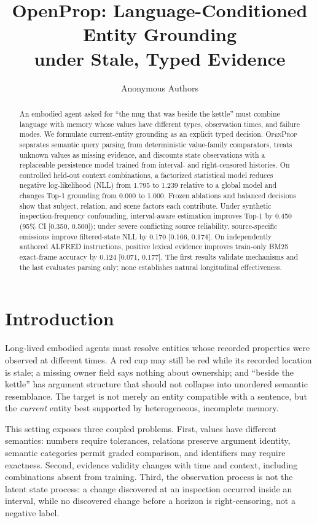 \documentclass{article}
\title{OpenProp: Language-Conditioned Entity Grounding\\under Stale, Typed Evidence}
\author{Anonymous Authors}
\newcommand{\method}{\textsc{OpenProp}}
\begin{document}
\maketitle

\begin{abstract}
An embodied agent asked for ``the mug that was beside the kettle'' must combine language with memory whose values have different types, observation times, and failure modes. We formulate current-entity grounding as an explicit typed decision. \method{} separates semantic query parsing from deterministic value-family comparators, treats unknown values as missing evidence, and discounts state observations with a replaceable persistence model trained from interval- and right-censored histories. On controlled held-out context combinations, a factorized statistical model reduces negative log-likelihood (NLL) from 1.795 to 1.239 relative to a global model and changes Top-1 grounding from 0.000 to 1.000. Frozen ablations and balanced decisions show that subject, relation, and scene factors each contribute. Under synthetic inspection-frequency confounding, interval-aware estimation improves Top-1 by 0.450 (95\% CI [0.350, 0.500]); under severe conflicting source reliability, source-specific emissions improve filtered-state NLL by 0.170 [0.166, 0.174]. On independently authored ALFRED instructions, positive lexical evidence improves train-only BM25 exact-frame accuracy by 0.124 [0.071, 0.177]. The first results validate mechanisms and the last evaluates parsing only; none establishes natural longitudinal effectiveness.
\end{abstract}

\section{Introduction}
Long-lived embodied agents must resolve entities whose recorded properties were observed at different times. A red cup may still be red while its recorded location is stale; a missing owner field says nothing about ownership; and ``beside the kettle'' has argument structure that should not collapse into unordered semantic resemblance. The target is not merely an entity compatible with a sentence, but the \emph{current} entity best supported by heterogeneous, incomplete memory.

This setting exposes three coupled problems. First, values have different semantics: numbers require tolerances, relations preserve argument identity, semantic categories permit graded comparison, and identifiers may require exactness. Second, evidence validity changes with time and context, including combinations absent from training. Third, the observation process is not the latent state process: a change discovered at an inspection occurred inside an interval, while no discovered change before a horizon is right-censoring, not a negative label.
\end{document}
